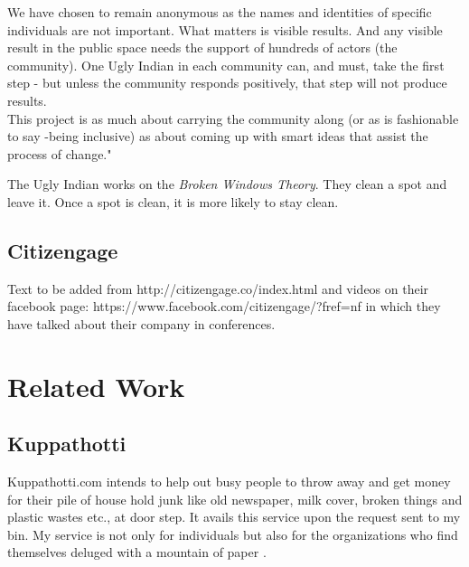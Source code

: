 \documentclass[10pt]{article}
\begin{document}
We have chosen to remain anonymous as the names and identities of specific individuals are not important. What matters is visible results. And any visible result in the public space needs the support of hundreds of actors (the community). One Ugly Indian in each community can, and must, take the first step - but unless the community responds positively, that step will not produce results.\\
This project is as much about carrying the community along (or as is fashionable to say -being inclusive) as about coming up with smart ideas that assist the process of change."

The Ugly Indian works on the \emph{Broken Windows Theory}. They clean a spot and leave it. Once a spot is clean, it is more likely to stay clean.


\subsection{Citizengage}

Text to be added from http://citizengage.co/index.html and videos on their facebook page: https://www.facebook.com/citizengage/?fref=nf in which they have talked about their company in conferences.

\section{Related Work}

\subsection{Kuppathotti}

Kuppathotti.com intends to help out busy people to throw away and get money for their pile of house hold junk like old newspaper, milk cover, broken things and plastic wastes etc., at door step. It avails this service upon the request sent to my bin. My service is not only for individuals but also for the organizations who find themselves deluged with a mountain of paper \citep{Kuppathotti:home}.
\end{document}
